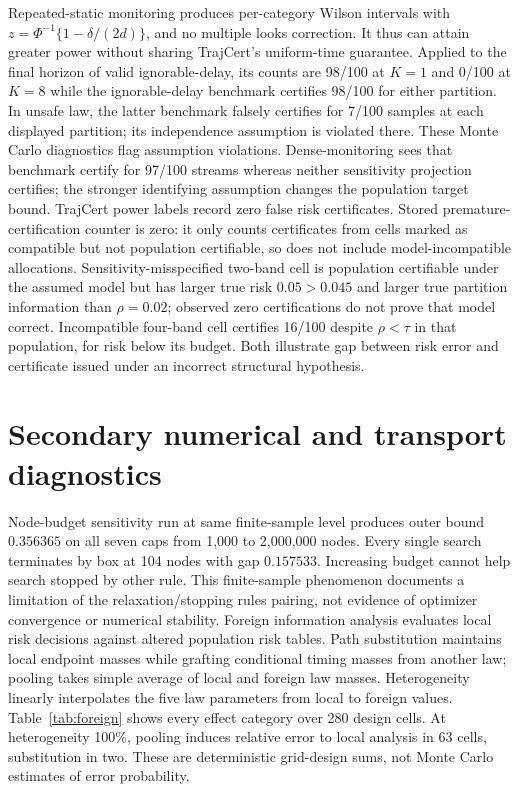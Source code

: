 Repeated-static monitoring produces per-category Wilson intervals with $z=\Phi^{-1}\{1-\delta/(2d)\}$, and no multiple looks correction. It thus can attain greater power without sharing TrajCert's uniform-time guarantee. Applied to the final horizon of valid ignorable-delay, its counts are 98/100 at $K=1$ and 0/100 at $K=8$ while the ignorable-delay benchmark certifies 98/100 for either partition. In unsafe law, the latter benchmark falsely certifies for 7/100 samples at each displayed partition; its independence assumption is violated there. These Monte Carlo diagnostics flag assumption violations. Dense-monitoring sees that benchmark certify for 97/100 streams whereas neither sensitivity projection certifies; the stronger identifying assumption changes the population target bound.
TrajCert power labels record zero false risk certificates. Stored premature-certification counter is zero: it only counts certificates from cells marked as compatible but not population certifiable, so does not include model-incompatible allocations. Sensitivity-misspecified two-band cell is population certifiable under the assumed model but has larger true risk $0.05>0.045$ and larger true partition information than $\rho=0.02$; observed zero certifications do not prove that model correct. Incompatible four-band cell certifies 16/100 despite $\rho<\tau$ in that population, for risk below its budget. Both illustrate gap between risk error and certificate issued under an incorrect structural hypothesis.
\section{Secondary numerical and transport diagnostics} 
Node-budget sensitivity run at same finite-sample level produces outer bound $0.356365$ on all seven caps from 1,000 to 2,000,000 nodes. Every single search terminates by box at 104 nodes with gap $0.157533$. Increasing budget cannot help search stopped by other rule. This finite-sample phenomenon documents a limitation of the relaxation/stopping rules pairing, not evidence of optimizer convergence or numerical stability.
Foreign information analysis evaluates local risk decisions against altered population risk tables. Path substitution maintains local endpoint masses while grafting conditional timing masses from another law; pooling takes simple average of local and foreign law masses. Heterogeneity linearly interpolates the five law parameters from local to foreign values. Table~\ref{tab:foreign} shows every effect category over 280 design cells. At heterogeneity 100\%, pooling induces relative error to local analysis in 63 cells, substitution in two. These are deterministic grid-design sums, not Monte Carlo estimates of error probability.

